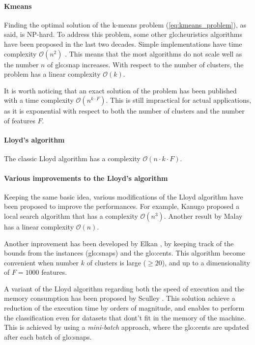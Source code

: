 \paragraph*{Kmeans}
Finding the optimal solution of the k-means problem (\autoref{eq:kmeans_problem}), as said, is NP-hard.
To address this problem, some other {\gls{glo:heuristic}}s algorithms have been proposed in the last two decades. Simple implementations have time complexity $\mathcal{O}(n^2)$ \cite{Kmeans_linear}.  This means that the most algorithms do not scale well as the number $n$ of {\gls{glo:snap}} increases. With respect to the number of clusters, the problem has a linear complexity $\mathcal{O}(k)$.

It is worth noticing that an exact solution of the problem has been published \cite{Kmeans_vornoi_japan} with a time complexity $\mathcal{O}(n^{k\cdot F})$. This is still impractical for actual applications, as it is exponential with respect to both the number of clusters and the number of features $F$.

\paragraph*{Lloyd's algorithm}
The classic Lloyd algorithm \cite{Lloyd1982} has a complexity $\mathcal{O}(n\cdot k\cdot F )$.

\paragraph*{Various improvements to the Lloyd's algorithm} Keeping the same basic idea, various modifications of the Lloyd algorithm have been proposed to improve the performances. For example, Kanugo \cite{kanungo2004local} proposed a local search algorithm that has a complexity $\mathcal{O}(n^3)$. Another result by Malay \cite{Kmeans_linear} has a linear complexity $\mathcal{O}(n)$. 

Another inprovement has been developed by Elkan \cite{kmeans-accelerated}, by keeping track of the bounds from the instances ({\gls{glo:snap}}s) and the {\gls{glo:cent}}s. This algorithm become convenient when number $k$ of clusters is large ($\geq 20$), and up to a dimensionality of $F=1000$ features.

A variant of the Lloyd algorithm regarding both the speed of execution and the memory consumption has been proposed by Sculley \cite{Sculley2010}. This solution achieve a reduction of the execution time by orders of magnitude, and enables to perform the classification even for datasets that dont't fit in the memory of the machine. This is achieved by using a \emph{mini-batch} approach, where the {\gls{glo:cent}}s are updated after each batch of {\gls{glo:snap}}s.

